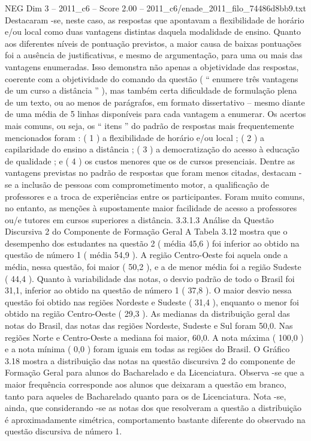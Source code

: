 \begin{textsample}{NEG Dim 3 – 2011\_c6 – Score 2.00 – 2011\_c6/enade\_2011\_filo\_74486d8bb9.txt}
Destacaram -se, neste caso, as respostas que apontavam a flexibilidade de horário e/ou local como duas vantagens distintas daquela modalidade de ensino.
Quanto aos diferentes níveis de pontuação previstos, a maior causa de baixas pontuações foi a ausência de justificativas, e mesmo de argumentação, para uma ou mais das vantagens enumeradas.
Isso demonstra não apenas a objetividade das respostas, coerente com a objetividade do comando da questão ( “ enumere três vantagens de um curso a distância ” ), mas também certa dificuldade de formulação plena de um texto, ou ao menos de parágrafos, em formato dissertativo – mesmo diante de uma média de 5 linhas disponíveis para cada vantagem a enumerar.
Os acertos mais comuns, ou seja, os “ itens ” do padrão de respostas mais frequentemente mencionados foram : ( 1 ) a flexibilidade de horário e/ou local ; ( 2 ) a capilaridade do ensino a distância ; ( 3 ) a democratização do acesso à educação de qualidade ; e ( 4 ) os custos menores que os de cursos presenciais.
Dentre as vantagens previstas no padrão de respostas que foram menos citadas, destacam -se a inclusão de pessoas com comprometimento motor, a qualificação de professores e a troca de experiências entre os participantes.
Foram muito comuns, no entanto, as menções à supostamente maior facilidade de acesso a professores ou/e tutores em cursos superiores a distância. 3.3.1.3 Análise da Questão Discursiva 2 do Componente de Formação Geral A Tabela 3.12 mostra que o desempenho dos estudantes na questão 2 ( média 45,6 ) foi inferior ao obtido na questão de número 1 ( média 54,9 ).
A região Centro-Oeste foi aquela onde a média, nessa questão, foi maior ( 50,2 ), e a de menor média foi a região Sudeste ( 44,4 ).
Quanto à variabilidade das notas, o desvio padrão de todo o Brasil foi 31,1, inferior ao obtido na questão de número 1 ( 37,8 ).
O maior desvio nessa questão foi obtido nas regiões Nordeste e Sudeste ( 31,4 ), enquanto o menor foi obtido na região Centro-Oeste ( 29,3 ).
As medianas da distribuição geral das notas do Brasil, das notas das regiões Nordeste, Sudeste e Sul foram 50,0.
Nas regiões Norte e Centro-Oeste a mediana foi maior, 60,0.
A nota máxima ( 100,0 ) e a nota mínima ( 0,0 ) foram iguais em todas as regiões do Brasil.
O Gráfico 3.18 mostra a distribuição das notas na questão discursiva 2 do componente de Formação Geral para alunos do Bacharelado e da Licenciatura.
Observa -se que a maior frequência corresponde aos alunos que deixaram a questão em branco, tanto para aqueles de Bacharelado quanto para os de Licenciatura.
Nota -se, ainda, que considerando -se as notas dos que resolveram a questão a distribuição é aproximadamente simétrica, comportamento bastante diferente do observado na questão discursiva de número 1.

\end{textsample}
